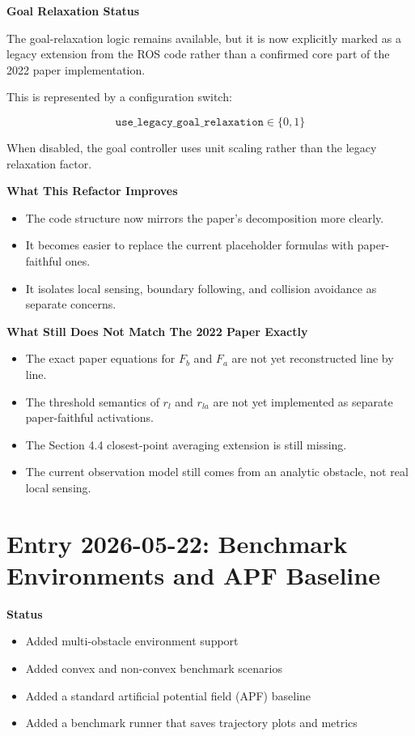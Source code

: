 \documentclass[11pt]{article}
\begin{document}
\textbf{Goal Relaxation Status}

The goal-relaxation logic remains available, but it is now explicitly marked as
a legacy extension from the ROS code rather than a confirmed core part of the
2022 paper implementation.

This is represented by a configuration switch:

\begin{equation}
\texttt{use\_legacy\_goal\_relaxation} \in \{0,1\}
\end{equation}

When disabled, the goal controller uses unit scaling rather than the legacy
relaxation factor.

\textbf{What This Refactor Improves}

\begin{itemize}[leftmargin=*]
  \item The code structure now mirrors the paper's decomposition more clearly.
  \item It becomes easier to replace the current placeholder formulas with
  paper-faithful ones.
  \item It isolates local sensing, boundary following, and collision avoidance
  as separate concerns.
\end{itemize}

\textbf{What Still Does Not Match The 2022 Paper Exactly}

\begin{itemize}[leftmargin=*]
  \item The exact paper equations for $F_b$ and $F_a$ are not yet reconstructed line by line.
  \item The threshold semantics of $r_l$ and $r_{la}$ are not yet implemented as separate paper-faithful activations.
  \item The Section 4.4 closest-point averaging extension is still missing.
  \item The current observation model still comes from an analytic obstacle, not real local sensing.
\end{itemize}

\section*{Entry 2026-05-22: Benchmark Environments and APF Baseline}

\textbf{Status}

\begin{itemize}[leftmargin=*]
  \item Added multi-obstacle environment support
  \item Added convex and non-convex benchmark scenarios
  \item Added a standard artificial potential field (APF) baseline
  \item Added a benchmark runner that saves trajectory plots and metrics
\end{itemize}
\end{document}
